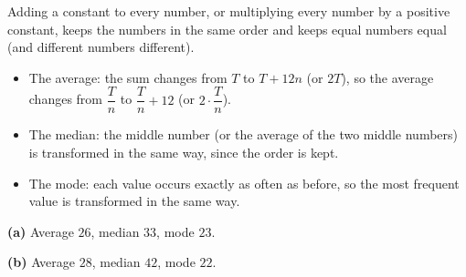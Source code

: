 Adding a constant to every number, or multiplying every number by a positive constant, keeps the numbers in the same order and keeps equal numbers equal (and different numbers different).
\begin{itemize}
\item The average: the sum changes from $T$ to $T+12n$ (or $2T$), so the average changes from $\dfrac{T}{n}$ to $\dfrac{T}{n}+12$ (or $2\cdot\dfrac{T}{n}$).
\item The median: the middle number (or the average of the two middle numbers) is transformed in the same way, since the order is kept.
\item The mode: each value occurs exactly as often as before, so the most frequent value is transformed in the same way.
\end{itemize}
\textbf{(a)} Average $\boxed{26}$, median $\boxed{33}$, mode $\boxed{23}$.

\textbf{(b)} Average $\boxed{28}$, median $\boxed{42}$, mode $\boxed{22}$.
